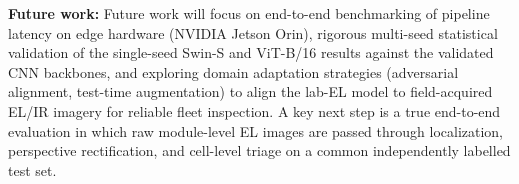 \documentclass[conference]{IEEEtran}
\begin{document}
\textbf{Future work:} Future work will focus on end-to-end benchmarking of pipeline latency on edge hardware (NVIDIA Jetson Orin), rigorous multi-seed statistical validation of the single-seed Swin-S and ViT-B/16 results against the validated CNN backbones, and exploring domain adaptation strategies (adversarial alignment, test-time augmentation) to align the lab-EL model to field-acquired EL/IR imagery for reliable fleet inspection. A key next step is a true end-to-end evaluation in which raw module-level EL images are passed through localization, perspective rectification, and cell-level triage on a common independently labelled test set.

{\small


}
\end{document}

